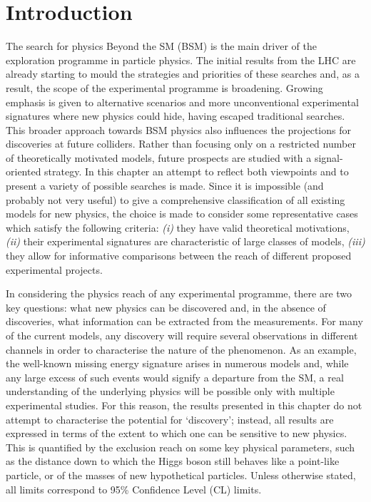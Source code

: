 \documentclass[../report.tex]{subfiles}
\begin{document}
\section{Introduction}

The search for physics Beyond the SM (BSM) is the main driver of the exploration programme in particle physics. The initial results from the LHC are already starting to mould the strategies and priorities of these searches and, as a result, the scope of the experimental programme is broadening. Growing emphasis is given to alternative scenarios and more unconventional experimental signatures where new physics could hide, having escaped traditional searches. This broader approach towards BSM physics also influences the projections for discoveries at future colliders. Rather than focusing only on a restricted number of theoretically motivated models, future prospects are studied with a signal-oriented strategy. In this chapter an attempt to reflect both viewpoints and to present a variety of possible searches is made. Since it is impossible (and probably not very useful) to give a comprehensive classification of all existing models for new physics, the choice is made to consider some representative cases which satisfy the following criteria: {\it (i)} they have valid theoretical motivations, {\it (ii)} their experimental signatures are characteristic of large classes of models, {\it (iii)} they allow for informative comparisons between the reach of different proposed experimental projects.

In considering the physics reach of any experimental programme, there are two key questions: what new physics can be discovered and, in the absence of discoveries, what information can be extracted from the measurements. For many of the current models, any discovery will require several observations in different channels in order to characterise the nature of the phenomenon. As an example, the well-known missing energy signature arises in numerous models and, while any large excess of such events would signify a departure from the SM, a real understanding of the underlying physics will be possible only with multiple experimental studies. For this reason, the results presented in this chapter do not attempt to characterise the potential for `discovery'; instead, all results are expressed in terms of the extent to which one can be sensitive to new physics. This is quantified by the exclusion reach on some key physical parameters, such as the distance down to which the Higgs boson still behaves like a point-like particle, or of the masses of new hypothetical particles. Unless otherwise stated, all limits correspond to 95\% Confidence Level (CL) limits. 
\end{document}
